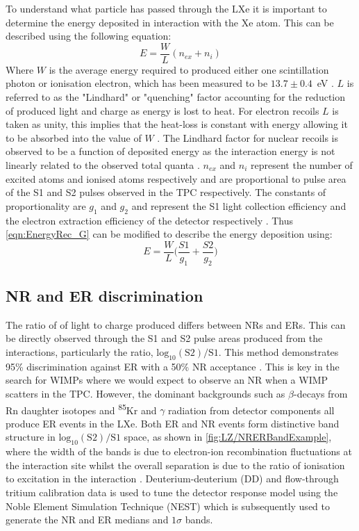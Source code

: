 To understand what particle has passed through the LXe it is important to determine the energy deposited in interaction with the Xe atom. This can be described using the following equation:
\begin{equation}
    E=\frac{W}{L}(n_{ex}+n_{i})
    \label{eqn:EnergyRec_noG}
\end{equation}
Where $W$ is the average energy required to produced either one scintillation photon or ionisation electron, which has been measured to be $13.7\pm0.4$~eV \cite{Goetzke:2016lfg, Dahl:2009nta}.
$L$ is referred to as the "Lindhard" or "quenching" factor accounting for the reduction of produced light and charge as energy is lost to heat. For electron recoils $L$ is taken as unity, this implies that the heat-loss is constant with energy allowing it to be absorbed into the value of $W$ \cite{Rischbieter:2022}. The Lindhard factor for nuclear recoils is observed to be a function of deposited energy as the interaction energy is not linearly related to the observed total quanta \cite{Sorensen:2011bd}.
$n_{ex}$ and $n_{i}$ represent the number of excited atoms and ionised atoms respectively and are proportional to pulse area of the S1 and S2 pulses observed in the TPC respectively. The constants of proportionality are $g_1$ and $g_2$ and represent the S1 light collection efficiency and the electron extraction efficiency of the detector respectively \cite{NEST1}. Thus \autoref{eqn:EnergyRec_G} can be modified to describe the energy deposition using:
\begin{equation}
    E=\frac{W}{L}\bigg(\frac{S1}{g_1}+\frac{S2}{g_2}\biggl)
    \label{eqn:EnergyRec_G}
\end{equation}

\subsection{NR and ER discrimination}\label{LZ/NRERDiscrim}
The ratio of of light to charge produced differs between NRs and ERs. This can be directly observed through the S1 and S2 pulse areas produced from the interactions, particularly the ratio, $\text{log}_{10}(\text{S2})/\text{S1}$. This method demonstrates 95\% discrimination against ER with a 50\% NR acceptance \cite{lzSens}. This is key in the search for WIMPs where we would expect to observe an NR when a WIMP scatters in the TPC. However, the dominant backgrounds such as $\beta$-decays from Rn daughter isotopes and \textsuperscript{85}Kr and $\gamma$ radiation from detector components all produce ER events in the LXe. Both ER and NR events form distinctive band structure in $\text{log}_{10}(\text{S2})/\text{S1}$ space, as shown in \autoref{fig:LZ/NRERBandExample}, where the width of the bands is due to electron-ion recombination fluctuations at the interaction site whilst the overall separation is due to the ratio of ionisation to excitation in the interaction \cite{Dahl:2009nta}. Deuterium-deuterium (DD) and flow-through tritium calibration data is used to tune the detector response model using the Noble Element Simulation Technique (NEST) \cite{NEST2011} which is subsequently used to generate the NR and ER medians and $1\sigma$ bands.  


